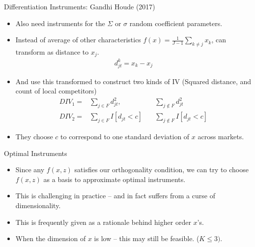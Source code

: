 \documentclass[xcolor=pdftex,dvipsnames,table,mathserif,aspectratio=169]{beamer}
\begin{document}
\begin{frame}{Differentiation Instruments: Gandhi Houde (2017)}
\begin{itemize}
\item Also need instruments for the $\Sigma$ or $\sigma$ random coefficient parameters.
\item Instead of average of other characteristics $f(x) = \frac{1}{J-1} \sum_{k \neq j} x_k$, can transform as distance to $x_j$.
\begin{eqnarray*}
d_{jt} ^k=  x_k - x_j  
\end{eqnarray*}
\item And use this transformed to construct two kinds of IV (Squared distance, and count of local competitors)
\begin{eqnarray*}
DIV_1 =& \sum_{j \in F}  d_{jt}^2,  \quad &\sum_{j \notin F}  d_{jt}^2 \\
DIV_2 =& \sum_{j \in F}  I[d_{jt} < c]   \quad &\sum_{j \notin F}   I[d_{jt} < c]
\end{eqnarray*}
\item They choose $c$ to correspond to one standard deviation of $x$ across markets.
\end{itemize}
\end{frame}


\begin{frame}{Optimal Instruments}
\begin{itemize}
\item Since any $f(x,z)$ satisfies our orthogonality condition, we can try to choose $f(x,z)$ as a \alert{basis} to approximate optimal instruments.
\item This is challenging in practice -- and in fact suffers from a curse of dimensionality.
\item This is frequently given as a rationale behind higher order $x$'s.
\item When the dimension of $x$ is low -- this may still be feasible. ($K \leq 3)$.
\end{itemize}
\end{frame}
\end{document}
